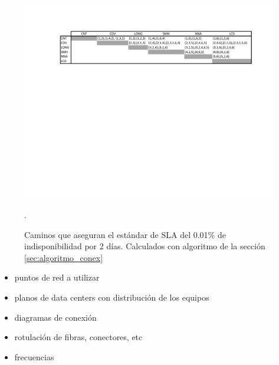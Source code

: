 \begin{figure}[H]
  \centering
  \includegraphics[width=13cm]{Imagenes/caminos}
  \caption[Caminos calculados por algoritmo de disponibilidad]{Caminos que aseguran el estándar de SLA del 0.01\% de indisponibilidad por 2 días. Calculados con algoritmo de la sección \ref{sec:algoritmo_conex}}.
  \label{fig:caminos}
\end{figure}





\begin{itemize}
\item puntos de red a utilizar
\item planos de data centers con distribución de los equipos
\item diagramas de conexión
\item rotulación de fibras, conectores, etc
\item frecuencias
\end{itemize}
